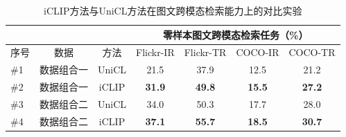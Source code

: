 \begin{table}
    \centering
    \caption{iCLIP方法与UniCL方法在图文跨模态检索能力上的对比实验}
    \begin{tabular}{lcccccc}
    \toprule
        \multicolumn{1}{c}{} &
        \multicolumn{1}{c}{} & \multicolumn{1}{c}{} & \multicolumn{4}{c}{零样本图文跨模态检索任务（\%）} \\
        \midrule
        序号 & 数据 & 方法 & Flickr-IR & Flickr-TR & COCO-IR & COCO-TR    \\
        \midrule
        \#1 & 数据组合一 & UniCL & 21.5 & 37.9 & 12.5 & 21.2 \\  
        \#2 & 数据组合一 & iCLIP & \textbf{31.9} & \textbf{49.8} & \textbf{15.5} & \textbf{27.2} \\  

        \midrule
        
        \#3 & 数据组合二 & UniCL & 34.0 & 50.3 & 17.7 & 28.0 \\
        \#4 & 数据组合二 & iCLIP & \textbf{37.1} & \textbf{55.7} & \textbf{18.5} & \textbf{30.7}\\   
        
        \bottomrule
    \end{tabular}

    \label{tab:iclip-tounicl-ret}
\end{table}




